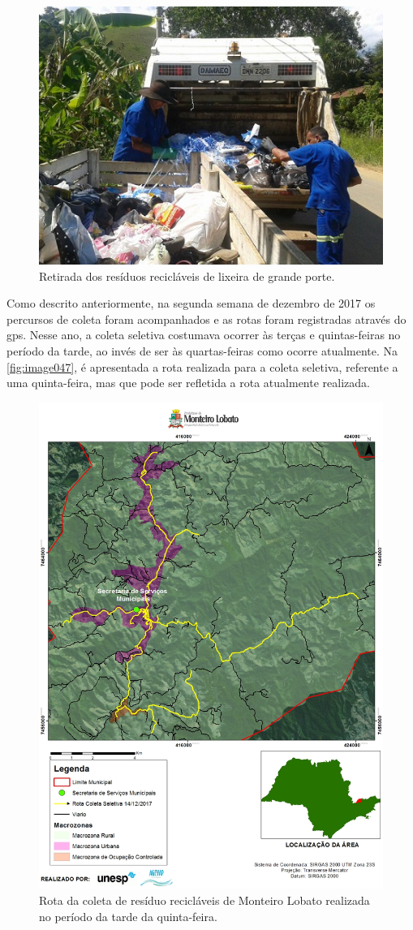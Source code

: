 	\begin{figure}
		\centering
		\includegraphics[width=0.75\linewidth]{produtos/prodtres/image046}
		\caption{Retirada dos resíduos recicláveis de lixeira de grande porte.}
		\label{fig:image046}
	\end{figure}
	
	
	Como descrito anteriormente, na segunda semana de dezembro de 2017 os percursos de coleta foram acompanhados e as rotas foram registradas através do \gls{gps}. Nesse ano, a coleta seletiva costumava ocorrer às terças e quintas-feiras no período da tarde, ao invés de ser às quartas-feiras como ocorre atualmente. Na \autoref{fig:image047}, é apresentada a rota realizada para a coleta seletiva, referente a uma quinta-feira, mas que pode ser refletida a rota atualmente realizada.
	
	\begin{figure}
		\centering
		\includegraphics[width=0.75\linewidth]{produtos/prodtres/image047}
		\caption{Rota da coleta de resíduo recicláveis de Monteiro Lobato realizada no período da tarde da quinta-feira.}
		\label{fig:image047}
	\end{figure}
	
